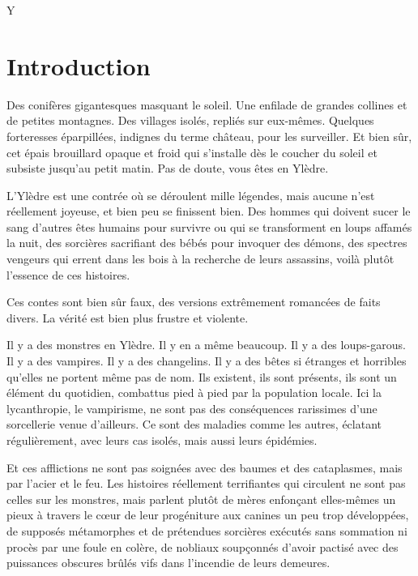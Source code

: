 \documentclass{report}
\begin{document}

\begin{center}
{\fontsize{4cm}{0}\selectfont Y}
\end{center}

\chapter{Introduction}

Des conifères gigantesques masquant le soleil. Une enfilade de grandes collines et de petites montagnes. Des villages isolés, repliés sur eux-mêmes. Quelques forteresses éparpillées, indignes du terme château, pour les surveiller. Et bien sûr, cet épais brouillard opaque et froid qui s'installe dès le coucher du soleil et subsiste jusqu'au petit matin. Pas de doute, vous êtes en Ylèdre.

L'Ylèdre est une contrée où se déroulent mille légendes, mais aucune n'est réellement joyeuse, et bien peu se finissent bien. Des hommes qui doivent sucer le sang d'autres êtes humains pour survivre ou qui se transforment en loups affamés la nuit, des sorcières sacrifiant des bébés pour invoquer des démons, des spectres vengeurs qui errent dans les bois à la recherche de leurs assassins, voilà plutôt l'essence de ces histoires.

Ces contes sont bien sûr faux, des versions extrêmement romancées de faits divers. La vérité est bien plus frustre et violente.

Il y a des monstres en Ylèdre. Il y en a même beaucoup. Il y a des loups-garous. Il y a des vampires. Il y a des changelins. Il y a des bêtes si étranges et horribles qu'elles ne portent même pas de nom. Ils existent, ils sont présents, ils sont un élément du quotidien, combattus pied à pied par la population locale. Ici la lycanthropie, le vampirisme, ne sont pas des conséquences rarissimes d'une sorcellerie venue d'ailleurs. Ce sont des maladies comme les autres, éclatant régulièrement, avec leurs cas isolés, mais aussi leurs épidémies.

Et ces afflictions ne sont pas soignées avec des baumes et des cataplasmes, mais par l'acier et le feu. Les histoires réellement terrifiantes qui circulent ne sont pas celles sur les monstres, mais parlent plutôt de mères enfonçant elles-mêmes un pieux à travers le cœur de leur progéniture aux canines un peu trop développées, de supposés métamorphes et de prétendues sorcières exécutés sans sommation ni procès par une foule en colère, de nobliaux soupçonnés d'avoir pactisé avec des puissances obscures brûlés vifs dans l'incendie de leurs demeures.
\end{document}
